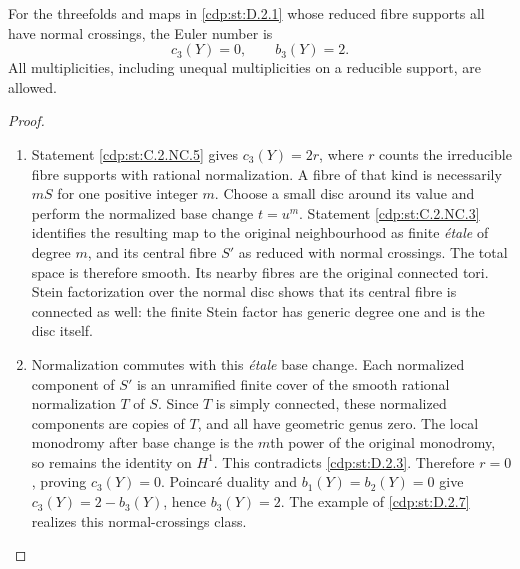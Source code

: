\begin{proposition}\hypertarget{tag-01GB}{}\label{cdp:st:D.2.4}


For the threefolds and maps in \ref{cdp:st:D.2.1} whose reduced fibre supports
all have normal crossings, the Euler number is
\[
c_3(Y)=0,\qquad b_3(Y)=2.
\]
All multiplicities, including unequal multiplicities on a
reducible support, are allowed.
\end{proposition}


\begin{proof}

\begin{enumerate}[leftmargin=*]
\item Statement \ref{cdp:st:C.2.NC.5} gives $c_3(Y)=2r$, where $r$ counts the
irreducible fibre supports with rational normalization. A fibre
of that kind is necessarily $mS$ for one positive integer $m$.
Choose a small disc around its value and perform the normalized
base change $t=u^m$. Statement \ref{cdp:st:C.2.NC.3} identifies the resulting
map to the original neighbourhood as finite \emph{\'etale} of
degree $m$, and its central fibre $S'$ as reduced with normal
crossings. The total space is therefore smooth. Its nearby
fibres are the original connected tori. Stein factorization
over the normal disc shows that its central fibre is connected
as well: the finite Stein factor has generic degree one and is
the disc itself.

\item Normalization commutes with this \emph{\'etale} base change.
Each normalized component of $S'$ is an unramified finite cover
of the smooth rational normalization $T$ of $S$. Since $T$ is
simply connected, these normalized components are copies of
$T$, and all have geometric genus zero. The local monodromy
after base change is the $m$th power of the original monodromy,
so remains the identity on $H^1$. This contradicts \ref{cdp:st:D.2.3}.
Therefore $r=0$, proving $c_3(Y)=0$. Poincar\'e duality and
$b_1(Y)=b_2(Y)=0$ give $c_3(Y)=2-b_3(Y)$, hence $b_3(Y)=2$.
The example of \ref{cdp:st:D.2.7} realizes this normal-crossings class.

\end{enumerate}
\end{proof}